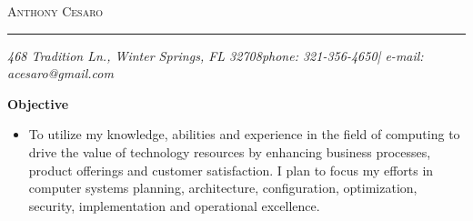 \documentclass[10pt,oneside]{article}
\makeatletter
\newcommand{\name}{Anthony Cesaro}
\newcommand{\email}{acesaro@gmail.com}
\newcommand{\addr}{468 Tradition Ln., Winter Springs, FL 32708}
\newcommand{\phone}{321-356-4650}
\newcommand{\bigname}[1]{
	\begin{flushleft}\selectfont\Large\scshape#1\end{flushleft}
}
\newenvironment{ressection}[1]{
	\vspace{4pt}
	\textbf{\selectfont\normalsize#1}
	\begin{itemize}
	\vspace{3pt}
}{
	\end{itemize}
}
\newcommand{\resitem}[1]{
	\vspace{-4pt}
	\item \begin{flushleft} #1 \end{flushleft}
}
\makeatother
\begin{document}
 \selectfont

\bigname{\name}

\vspace{-8pt} \rule{\textwidth}{1pt}

\vspace{-1pt} {\small\itshape \addr \hfill phone: \phone | e-mail: \email}

\vspace{8 pt}


\begin{ressection}{Objective}

	\resitem{To utilize my knowledge, abilities and experience in the field of computing to drive the value of technology resources by enhancing business processes, product offerings and customer satisfaction.  I plan to focus my efforts in computer systems planning, architecture, configuration, optimization, security, implementation and operational excellence.}

\end{ressection}

\end{document}
